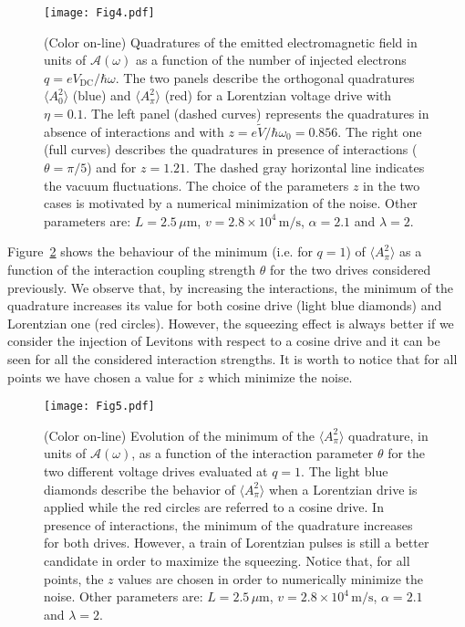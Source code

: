 \documentclass[12pt]{iopart}
\begin{document}
\begin{figure}[ht]
\centering
\texttt{[image: Fig4.pdf]}
\caption{(Color on-line) Quadratures of the emitted electromagnetic field in units of $\mathcal{A}(\omega)$ as a function of the number of injected electrons $q=eV_{\mathrm{DC}}/\hbar\omega$. The two panels describe the orthogonal quadratures $\langle A_0^2\rangle$ (blue) and $\langle A_\pi^2\rangle$ (red) for a Lorentzian voltage drive with $\eta=0.1$. The left panel (dashed curves) represents the quadratures in absence of interactions and with $z=e\tilde{V}/\hbar\omega_0=0.856$. The right one (full curves) describes the quadratures in presence of interactions ($\theta=\pi/5$) and for $z=1.21$. The dashed gray horizontal line indicates the vacuum fluctuations. The choice of the parameters $z$ in the two cases is motivated by a numerical minimization of the noise. Other parameters are: $L=2.5\,\mu\mathrm{m}$, $v=2.8\times 10^4\, \mathrm{m/s}$, $\alpha=2.1$ and $\lambda=2$.
} 
\label{Fig4}
\end{figure} 
Figure~\ref{Fig5} shows the behaviour of the minimum (i.e. for $q=1$) of $\langle A_\pi^2\rangle$ as a function of the interaction coupling strength $\theta$ for the two drives considered previously. We observe that, by increasing the interactions, the minimum of the quadrature increases its value for both cosine drive (light blue diamonds) and Lorentzian one (red circles). However, the squeezing effect is always better if we consider the injection of Levitons with respect to a cosine drive and it can be seen for all the considered interaction strengths. It is worth to notice that for all points we have chosen a value for $z$ which minimize the noise.\\
\begin{figure}[ht]
\centering
\texttt{[image: Fig5.pdf]}
\caption{(Color on-line) Evolution of the minimum of the $\langle A_{\pi}^2 \rangle$ quadrature, in units of $\mathcal{A}(\omega)$, as a function of the interaction parameter $\theta$ for the two different voltage drives evaluated at $q=1$. The light blue diamonds describe the behavior of $\langle A_{\pi}^2 \rangle$ when a Lorentzian drive is applied while the red circles are referred to a cosine drive. In presence of interactions, the minimum of the quadrature increases for both drives. However, a train of Lorentzian pulses is still a better candidate in order to maximize the squeezing. Notice that, for all points, the $z$ values are chosen in order to numerically minimize the noise. Other parameters are: $L=2.5\,\mu\mathrm{m}$, $v=2.8\times 10^4\, \mathrm{m/s}$, $\alpha=2.1$ and $\lambda=2$.} 
\label{Fig5}
\end{figure} 
\end{document}
